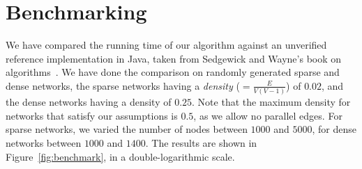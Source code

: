 \documentclass{llncs}
\begin{document}
\section{Benchmarking}\label{sec:benchmark}
  We have compared the running time of our algorithm against an unverified reference implementation in Java, taken from Sedgewick and Wayne's book on algorithms~\cite{SeWa11}.
  We have done the comparison on randomly generated sparse and dense networks, the sparse networks having a \emph{density} (${} = \frac{E}{V(V - 1)}$) of $0.02$, and the dense networks having a density of $0.25$. Note that the maximum density for networks that satisfy our assumptions is $0.5$, as we allow no parallel edges.
  For sparse networks, we varied the number of nodes between $1000$ and $5000$, for dense networks between $1000$ and $1400$.
  The results are shown in Figure~\ref{fig:benchmark}, in a double-logarithmic scale. 
 
\end{document}
